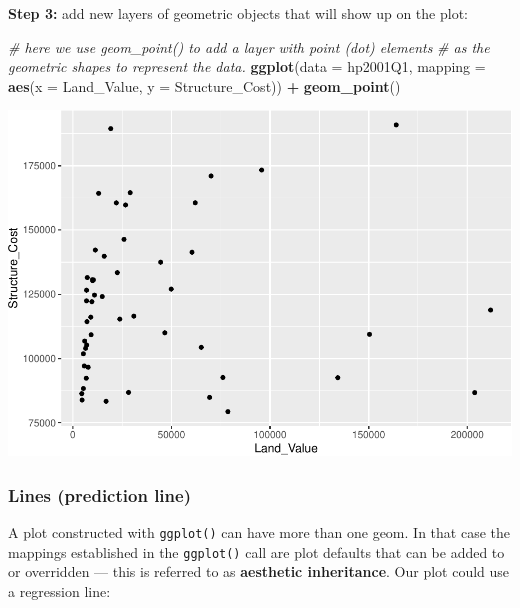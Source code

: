 \documentclass[]{book}
\newenvironment{Shaded}{\begin{snugshade}}{\end{snugshade}}
\newcommand{\CommentTok}[1]{\textcolor[rgb]{0.56,0.35,0.01}{\textit{#1}}}
\newcommand{\DataTypeTok}[1]{\textcolor[rgb]{0.13,0.29,0.53}{#1}}
\newcommand{\KeywordTok}[1]{\textcolor[rgb]{0.13,0.29,0.53}{\textbf{#1}}}
\newcommand{\NormalTok}[1]{#1}
\newcommand{\OperatorTok}[1]{\textcolor[rgb]{0.81,0.36,0.00}{\textbf{#1}}}
\newcommand{\StringTok}[1]{\textcolor[rgb]{0.31,0.60,0.02}{#1}}
\begin{document}
\textbf{Step 3:} add new layers of geometric objects that will show up on the plot:

\begin{Shaded}
\begin{Highlighting}[]
\CommentTok{# here we use geom_point() to add a layer with point (dot) elements }
\CommentTok{# as the geometric shapes to represent the data.}
\KeywordTok{ggplot}\NormalTok{(}\DataTypeTok{data =}\NormalTok{ hp2001Q1, }\DataTypeTok{mapping =} \KeywordTok{aes}\NormalTok{(}\DataTypeTok{x =}\NormalTok{ Land_Value, }\DataTypeTok{y =}\NormalTok{ Structure_Cost)) }\OperatorTok{+}
\StringTok{  }\KeywordTok{geom_point}\NormalTok{()}
\end{Highlighting}
\end{Shaded}

\includegraphics{R/Rgraphics/figures/unnamed-chunk-144-1.pdf}

\hypertarget{lines-prediction-line}{%
\subsubsection{Lines (prediction line)}\label{lines-prediction-line}}

A plot constructed with \texttt{ggplot()} can have more than one geom. In that case the mappings established in the \texttt{ggplot()} call are plot defaults that can be added to or overridden --- this is referred to as \textbf{aesthetic inheritance}. Our plot could use a regression line:
\end{document}
